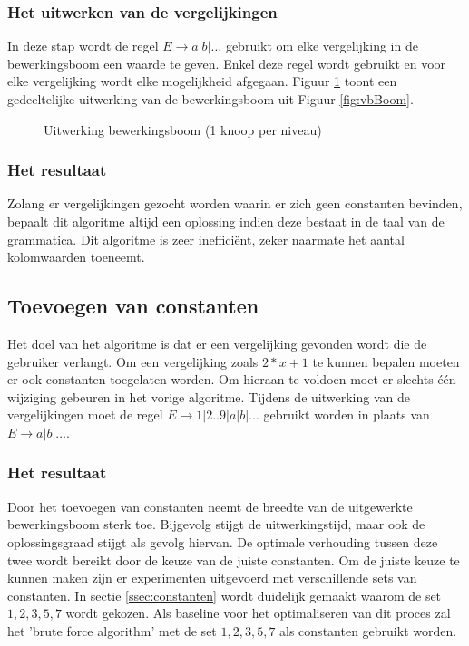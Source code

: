 \documentclass[Main.tex]{subfiles}
\begin{document}
\subsubsection*{Het uitwerken van de vergelijkingen}
In deze stap wordt de regel $E \rightarrow a | b | \dotsc$ gebruikt om elke vergelijking in de bewerkingsboom een waarde te geven. Enkel deze regel wordt gebruikt en voor elke vergelijking wordt elke mogelijkheid afgegaan. Figuur \ref{fig:uitwerkingsboom} toont een gedeeltelijke uitwerking van de bewerkingsboom uit Figuur \ref{fig:vbBoom}.
\begin{figure}[!htb]
\centering
{}
\caption{Uitwerking bewerkingsboom (1 knoop per niveau)} \label{fig:uitwerkingsboom}
\end{figure}

\subsubsection*{Het resultaat}
Zolang er vergelijkingen gezocht worden waarin er zich geen constanten bevinden, bepaalt dit algoritme altijd een oplossing indien deze bestaat in de taal van de grammatica. Dit algoritme is zeer ineffici\"ent, zeker naarmate het aantal kolomwaarden toeneemt. 

\subsection{Toevoegen van constanten}
Het doel van het algoritme is dat er een vergelijking gevonden wordt die de gebruiker verlangt. Om een vergelijking zoals $2 \ast x+1$ te kunnen bepalen moeten er ook constanten toegelaten worden. Om hieraan te voldoen moet er slechts \'e\'en wijziging gebeuren in het vorige algoritme. Tijdens de uitwerking van de vergelijkingen moet de regel $E \rightarrow 1 | 2 .. 9 | a | b | \dotsc$ gebruikt worden in plaats van $E \rightarrow a | b | \dotsc$.

\subsubsection*{Het resultaat}
Door het toevoegen van constanten neemt de breedte van de uitgewerkte bewerkingsboom sterk toe. Bijgevolg stijgt de uitwerkingstijd, maar ook de oplossingsgraad stijgt als gevolg hiervan. De optimale verhouding tussen deze twee wordt bereikt door de keuze van de juiste constanten. Om de juiste keuze te kunnen maken zijn er experimenten uitgevoerd met verschillende sets van constanten. In sectie  \ref{ssec:constanten} wordt duidelijk gemaakt waarom de set ${1, 2, 3, 5, 7}$ wordt gekozen. Als baseline voor het optimaliseren van dit proces zal het 'brute force algorithm' met de set ${1, 2, 3, 5, 7}$ als constanten gebruikt worden.
\end{document}
